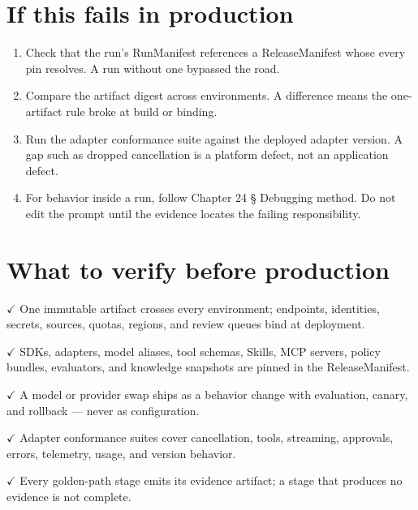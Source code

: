 \section{If this fails in production}

\begin{enumerate}

\item Check that the run's RunManifest references a ReleaseManifest whose every pin resolves. A run without one bypassed the road.

\item Compare the artifact digest across environments. A difference means the one-artifact rule broke at build or binding.

\item Run the adapter conformance suite against the deployed adapter version. A gap such as dropped cancellation is a platform defect, not an application defect.

\item For behavior inside a run, follow Chapter 24 § Debugging method. Do not edit the prompt until the evidence locates the failing responsibility.

\end{enumerate}

\section{What to verify before production}

\textbf{\ensuremath{\checkmark}} One immutable artifact crosses every environment; endpoints, identities, secrets, sources, quotas, regions, and review queues bind at deployment.\par

\textbf{\ensuremath{\checkmark}} SDKs, adapters, model aliases, tool schemas, Skills, MCP servers, policy bundles, evaluators, and knowledge snapshots are pinned in the ReleaseManifest.\par

\textbf{\ensuremath{\checkmark}} A model or provider swap ships as a behavior change with evaluation, canary, and rollback — never as configuration.\par

\textbf{\ensuremath{\checkmark}} Adapter conformance suites cover cancellation, tools, streaming, approvals, errors, telemetry, usage, and version behavior.\par

\textbf{\ensuremath{\checkmark}} Every golden-path stage emits its evidence artifact; a stage that produces no evidence is not complete.\par

